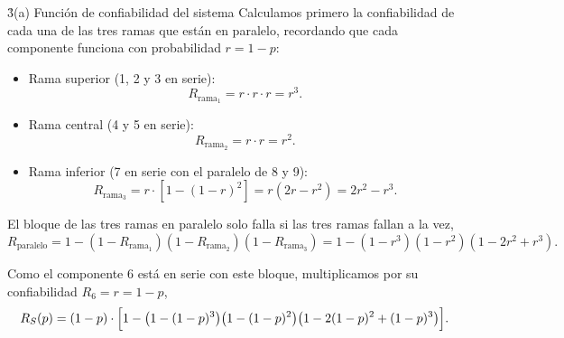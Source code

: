 \documentclass[main.tex]{subfiles}%
\begin{document}
\vspace{3mm}
\h3{(a) Función de confiabilidad del sistema}
Calculamos primero la confiabilidad de cada una de las tres ramas que están en paralelo, recordando que cada componente funciona con probabilidad $r = 1 - p$:
\begin{itemize}
    \item Rama superior (1, 2 y 3 en serie):
    \begin{equation*}
        R_{\text{rama}_1} = r \cdot r \cdot r = r^3.
    \end{equation*}
    \item Rama central (4 y 5 en serie):
    \begin{equation*}
        R_{\text{rama}_2} = r \cdot r = r^2.
    \end{equation*}
    \item Rama inferior (7 en serie con el paralelo de 8 y 9):
    \begin{equation*}
        R_{\text{rama}_3} = r \cdot \left[ 1 - (1 - r)^2 \right] = r(2r - r^2) = 2r^2 - r^3.
    \end{equation*}
\end{itemize}

El bloque de las tres ramas en paralelo solo falla si las tres ramas fallan a la vez,
\begin{equation*}
    R_{\text{paralelo}} = 1 - (1 - R_{\text{rama}_1})(1 - R_{\text{rama}_2})(1 - R_{\text{rama}_3}) = 1 - (1 - r^3)(1 - r^2)(1 - 2r^2 + r^3).
\end{equation*}

Como el componente 6 está en serie con este bloque, multiplicamos por su confiabilidad $R_6 = r = 1 - p$,
\begin{equation*}
    R_S(p) = (1 - p) \cdot \Bigl[ 1 - \bigl(1 - (1-p)^3\bigr)\bigl(1 - (1-p)^2\bigr)\bigl(1 - 2(1-p)^2 + (1-p)^3\bigr) \Bigr].
\end{equation*}

\end{document}
